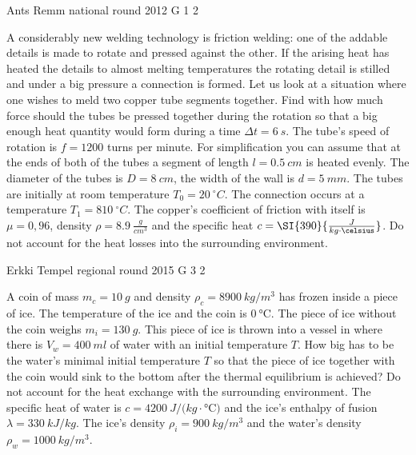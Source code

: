 \documentclass[11pt]{article}
\begin{document}
{Ants Remm} %
{national round} %
{2012} %
{G 1} %
{2} %
{

\ifEngStatement
A considerably new welding technology is friction welding: one of the addable details is made to rotate and pressed against the other. If the arising heat has heated the details to almost melting temperatures the rotating detail is stilled and under a big pressure a connection is formed. Let us look at a situation where one wishes to meld two copper tube segments together. Find with how much force should the tubes be pressed together during the rotation so that a big enough heat quantity would form during a time $\Delta t = \SI{6}{s}$. The tube’s speed of rotation is $f = 1200$ turns per minute. For simplification you can assume that at the ends of both of the tubes a segment of length $l
= \SI{0,5}{cm}$ is heated evenly. The diameter of the tubes is $D = \SI{8}{cm}$, the width of the wall is $d = \SI{5}{mm}$. The tubes are initially at room temperature $T_0 = \SI{20}{^\circ C}$. The connection occurs at a temperature $T_1 = \SI{810}{^\circ C}$. The copper’s coefficient of friction with itself is $\mu = 0,96$, density $\rho = \SI{8,9}{\frac{g}{cm^3}}$ and the specific heat $c = \SI{390}{\frac{J}{kg \cdot \celsius}}$. Do not account for the heat losses into the surrounding environment.
\fi
}

{Erkki Tempel} %
{regional round} %
{2015} %
{G 3} %
{2} %
{

\ifEngStatement
A coin of mass $m_c=\SI{10}{g}$ and density $\rho_c=\SI{8900}{kg/m^3}$ has frozen inside a piece of ice. The temperature of the ice and the coin is $\SI{0}{\celsius}$. The piece of ice without the coin weighs $m_i=\SI{130}{g}$. This piece of ice is thrown into a vessel in where there is $V_w=\SI{400}{ml}$ of water with an initial temperature $T$. How big has to be the water’s minimal initial temperature $T$ so that the piece of ice together with the coin would sink to the bottom after the thermal equilibrium is achieved? Do not account for the heat exchange with the surrounding environment. The specific heat of water is $c=\SI{4200}{J/ (kg\cdot\celsius)}$ and the ice’s enthalpy of fusion $\lambda=\SI{330}{kJ/kg}$. The ice’s density $\rho_i=\SI{900}{kg/m^3}$ and the water’s density $\rho_w=\SI{1000}{kg/m^3}$.
\fi
}
\end{document}
